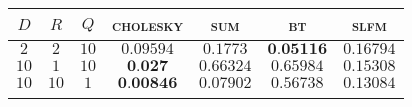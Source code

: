 
\begin{tabular}{|ccc|cccc|}
  \hline
  \abovespace\belowspace
  $D$ & $R$ & $Q$ & \textsc{cholesky} & \textsc{sum} & \textsc{bt} & \textsc{slfm}\\
\hline
  \abovespace
 $ 2 $ & $ 2 $ & $ 10 $ & $ 0.09594 $ & $ 0.1773 $ & $ \textbf{0.05116} $ & $ 0.16794 $ \\ 
 $ 10 $ & $ 1 $ & $ 10 $ & $ \textbf{0.027} $ & $ 0.66324 $ & $ 0.65984 $ & $ 0.15308 $ \\ 
 $ 10 $ & $ 10 $ & $ 1 $ & $ \textbf{0.00846} $ & $ 0.07902 $ & $ 0.56738 $ & $ 0.13084 $ \\ 

  \belowspace \\

  \hline
\end{tabular}
